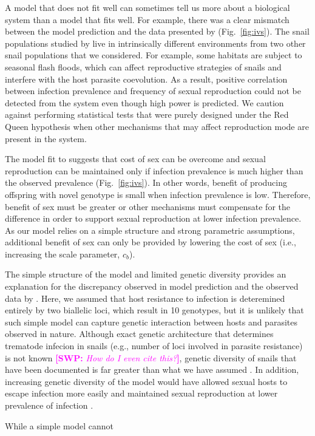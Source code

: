 \documentclass{article}\usepackage[]{graphicx}\usepackage[]{color}
\newcommand{\comment}[3]{\textcolor{#1}{\textbf{[#2: }\textit{#3}\textbf{]}}}
\newcommand{\swp}[1]{\comment{magenta}{SWP}{#1}}
\newcommand{\fref}[1]{Fig.~\ref{fig:#1}}
\begin{document}
A model that does not fit well can sometimes tell us more about a biological system than a model that fits well.
For example, there was a clear mismatch between the model prediction and the data presented by \cite{dagan2013clonal} (\fref{ivs}).
The snail populations studied by \cite{dagan2013clonal} live in intrinsically different environments from two other snail populations that we considered.
For example, some habitats are subject to seasonal flash floods, which can affect reproductive strategies of snails \citep{ben2007temporal} and interfere with the host parasite coevolution.
As a result, positive correlation between infection prevalence and frequency of sexual reproduction could not be detected from the system even though high power is predicted.
We caution against performing statistical tests that were purely designed under the Red Queen hypothesis when other mechanisms that may affect reproduction mode are present in the system.

The model fit to \cite{mckone2016fine} suggests that cost of sex can be overcome and sexual reproduction can be maintained only if infection prevalence is much higher than the observed prevalence (\fref{ivs}).
In other words, benefit of producing offspring with novel genotype is small when infection prevalence is low.
Therefore, benefit of sex must be greater or other mechanisms must compensate for the difference in order to support sexual reproduction at lower infection prevalence.
As our model relies on a simple structure and strong parametric assumptions, additional benefit of sex can only be provided by lowering the cost of sex (i.e., increasing the scale parameter, $c_b$).

The simple structure of the model and limited genetic diversity provides an explanation for the discrepancy observed in model prediction and the observed data by \cite{mckone2016fine}.
Here, we assumed that host resistance to infection is deteremined entirely by two biallelic loci, which result in 10 genotypes, but it is unlikely that such simple model can capture genetic interaction between hosts and parasites observed in nature.
Although exact genetic architecture that determines trematode infecion in snails (e.g., number of loci involved in parasite resistance) is not known \swp{How do I even cite this?}, genetic diversity of snails that have been documented is far greater than what we have assumed \citep{king2011parasites, dagan2013clonal}.
In addition, increasing genetic diversity of the model would have allowed sexual hosts to escape infection more easily and maintained sexual reproduction at lower prevalence of infection \citep{lively2010effect, king2012does, ashby2015diversity}.

While a simple model cannot 




\end{document}
